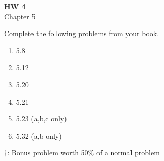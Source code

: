 \documentclass{article}
\begin{document}
\fancyfoot[C]{\thepage}
\vspace*{0cm}
\begin{center}
	{\LARGE \textbf{HW 4}}\\
	\vspace{.25cm}
	{\Large Chapter 5}
\end{center}

Complete the following problems from your book.

\begin{enumerate}
	\item 5.8
	\item 5.12
	\item 5.20
	\item 5.21
	\item 5.23 (a,b,c only)
	\item 5.32 (a,b only)
	
\end{enumerate}
$\dagger$: Bonus problem worth 50\% of a normal problem
\end{document}
